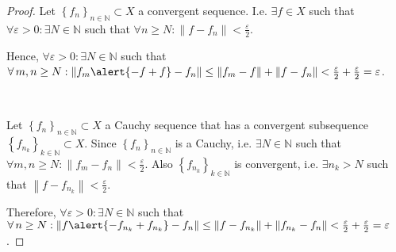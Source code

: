 \begin{frame}
	\begin{proof}
		Let ${\left\{f_{n}\right\}}_{n\in\mathds{N}}\subset X$ a
		convergent sequence.
		I.e. $\exists f\in X$ such that
		\begin{math}
			\forall\varepsilon>0:
			\exists N\in\mathds{N}
		\end{math}
		such that
		\begin{math}
			\forall n\geq N:
			\left\|f-f_{n}\right\|<
			\frac{\varepsilon}{2}
		\end{math}.

		Hence,
		\begin{math}
			\forall\varepsilon>0:
			\exists N\in\mathds{N}
		\end{math}
		such that
		\begin{math}
			\forall m,n\geq N:
			\left\|f_{m}\alert{-f+f}-f_{n}\right\|\leq
			\left\|f_{m}-f\right\|+
			\left\|f-f_{n}\right\|<
			\frac{\varepsilon}{2}+
			\frac{\varepsilon}{2}=
			\varepsilon
		\end{math}.

		\

		Let ${\left\{f_{n}\right\}}_{n\in\mathds{N}}\subset X$
		a Cauchy sequence that has a convergent subsequence
		${\left\{f_{n_{k}}\right\}}_{k\in\mathds{N}}\subset X$.
		Since ${\left\{f_{n}\right\}}_{n\in\mathds{N}}$ is a Cauchy, i.e.
		\begin{math}
			\exists N\in\mathds{N}
		\end{math}
		such that
		\begin{math}
			\forall m,n\geq N:
			\left\|f_{m}-f_{n}\right\|<
			\frac{\varepsilon}{2}
		\end{math}.
		Also ${\left\{f_{n_{k}}\right\}}_{k\in\mathds{N}}$ is convergent,
		i.e. $\exists n_{k}>N$ such that
		\begin{math}
			\left\|f-f_{n_{k}}\right\|<
			\frac{\varepsilon}{2}
		\end{math}.

		Therefore,
		\begin{math}
			\forall\varepsilon>0:
			\exists N\in\mathds{N}
		\end{math}
		such that
		\begin{math}
			\forall n\geq N:
			\left\|f\alert{-f_{n_{k}}+f_{n_{k}}}-f_{n}\right\|\leq
			\left\|f-f_{n_{k}}\right\|+
			\left\|f_{n_{k}}-f_{n}\right\|<
			\frac{\varepsilon}{2}+
			\frac{\varepsilon}{2}=
			\varepsilon
		\end{math}.
	\end{proof}
\end{frame}

